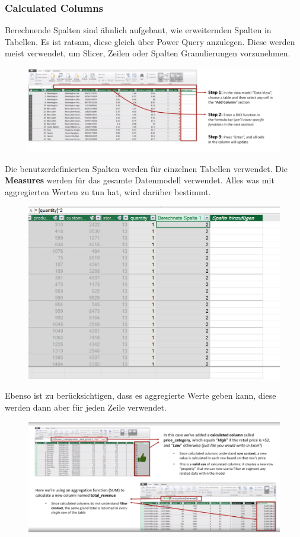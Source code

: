 \subsubsection{Calculated Columns}
Berechnende Spalten sind ähnlich aufgebaut, wie erweiternden Spalten in Tabellen. Es ist ratsam, diese gleich über Power Query anzulegen. Diese werden meist verwendet, um Slicer, Zeilen oder Spalten Granulierungen vorzunehmen. 
\begin{figure}[H]
	\centering
	\includegraphics[scale = 0.3]{attachment/chapter_1/screenshot077}
	\caption{}
	\label{fig:screenshot07}
\end{figure}
Die benutzerdefinierten Spalten werden für einzelnen Tabellen verwendet. Die \textbf{Measures} werden für das gesamte Datenmodell verwendet. Alles was mit aggregierten Werten zu tun hat, wird darüber bestimmt. 
\begin{figure}[H]
	\centering
	\includegraphics[scale = 0.3]{attachment/chapter_1/screenshot078}
	\caption{}
	\label{fig:screenshot078}
\end{figure}
Ebenso ist zu berücksichtigen, dass es aggregierte Werte geben kann, diese werden dann aber für jeden Zeile verwendet.
\begin{figure}[H]
	\centering
	\includegraphics[scale = 0.3]{attachment/chapter_1/screenshot079}
	\caption{}
	\label{fig:screenshot079}
\end{figure}
